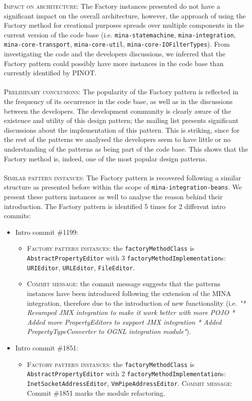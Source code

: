 \textsc{Impact on architecture}: The Factory instances presented do not have a significant impact on the overall architecture, however, the approach of using the Factory method for creational purposes spreads over multiple components in the current version of the code base (i.e. \texttt{mina-statemachine}, \texttt{mina-integration}, \texttt{mina-core-transport}, \texttt{mina-core-util}, \texttt{mina-core-IOFilterTypes}). From investigating the code and the developers discussions, we inferred that the Factory pattern could possibly have more instances in the code base than currently identified by PINOT.\\\\
\textsc{Preliminary conclusions}: The popularity of the Factory pattern is reflected in the frequency of its occurrence in the code base, as well as in the discussions between the developers. The development community is clearly aware of the existence and utility of this design pattern; the mailing list presents significant discussions about the implementation of this pattern. This is striking, since for the rest of the patterns we analysed the developers seem to have little or no understanding of the patterns as being part of the code base. This shows that the Factory method is, indeed, one of the most popular design patterns. \\\\
\textsc{Similar pattern instances}: The Factory pattern is recovered following a similar structure as presented before within the scope of \texttt{mina-integration-beans}. We present these pattern instances as well to analyse the reason behind their introduction. The Factory pattern is identified 5 times for 2 different intro commits: 
\begin{itemize}
    \item Intro commit \#1199:
        \begin{itemize}
            \item \textsc{Factory pattern instances}: the \texttt{factoryMethodClass} is \texttt{AbstractPropertyEditor} with 3 \texttt{factoryMethodImplementation}s: \texttt{URIEditor}, \texttt{URLEditor}, \texttt{FileEditor}.
            \item \textsc{Commit message}: the commit message suggests that the patterns instances have been introduced following the extension of the MINA integration, therefore due to the introduction of new functionality (i.e. \textit{"* Revamped JMX integration to make it work better with more POJO
    * Added more PropertyEditors to support JMX integration
    * Added PropertyTypeConverter to OGNL integration module"}).
        \end{itemize}
    \item Intro commit \#1851:
        \begin{itemize}
            \item \textsc{Factory pattern instances}: the \texttt{factoryMethodClass} is \texttt{AbstractPropertyEditor} with 2 \texttt{factoryMethodImplementation}s: \texttt{InetSocketAddressEditor}, \texttt{VmPipeAddressEditor}.
            \textsc{Commit message}: Commit \#1851 marks the module refactoring. 
        \end{itemize}
\end{itemize}

